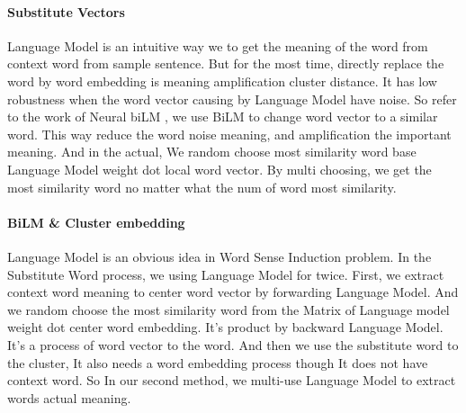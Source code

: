 \paragraph{Substitute Vectors}
Language Model is an intuitive way we to get the meaning of the word from context word from sample sentence.
But for the most time, directly replace the word by word embedding is meaning amplification cluster distance.
It has low robustness when the word vector causing by Language Model have noise.
So refer to the work of Neural biLM \cite{amrami-goldberg-2018-word}, we use BiLM to change word vector to a similar word.
This way reduce the word noise meaning, and amplification the important meaning.
And in the actual, We random choose most similarity word base Language Model weight dot local word vector.
By multi choosing, we get the most similarity word no matter what the num of word most similarity.

\paragraph{BiLM \& Cluster embedding}
Language Model is an obvious idea in Word Sense Induction problem.
In the Substitute Word process, we using Language Model for twice.
First, we extract context word meaning to center word vector by forwarding Language Model.
And we random choose the most similarity word from the Matrix of Language model weight dot center word embedding.
It's product by backward Language Model.
It's a process of word vector to the word.
And then we use the substitute word to the cluster, It also needs a word embedding process though It does not have context word.
So In our second method, we multi-use Language Model to extract words actual meaning.

